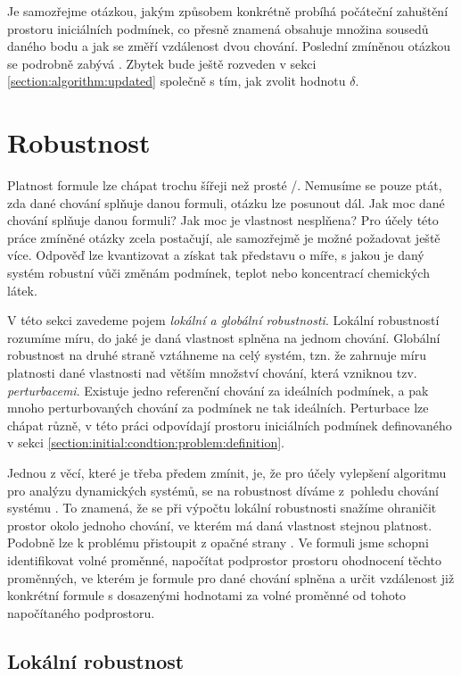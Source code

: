 Je samozřejme otázkou, jakým způsobem konkrétně probíhá počáteční zahuštění prostoru
iniciálních podmínek, co přesně znamená obsahuje mno\-žina sousedů daného bodu a jak
se změří vzdálenost dvou chování. Poslední zmíněnou otázkou se podrobně zabývá \cite{drazan2011}.
Zbytek bude ještě rozveden v sekci \ref{section:algorithm:updated} společně s tím,
jak zvolit hodnotu $\delta$.

\section{Robustnost}\label{section:robustness}

Platnost formule lze chápat trochu šířeji než prosté /.
Nemusíme se pouze ptát, zda dané chování splňuje danou formuli, otázku lze posunout dál.
Jak moc dané chování splňuje danou formuli? Jak moc je vlastnost nesplňena? Pro účely
této práce zmíněné otázky zcela postačují, ale samozřejmě je možné požadovat ještě více.
Odpověď lze kvantizovat a získat tak představu o míře, s  jakou je daný systém robustní
vůči změnám podmínek, teplot nebo koncentrací chemických látek.

V této sekci zavedeme pojem \textit{lokální a globální robustnosti}. Lokální robustností
rozumíme míru, do jaké je daná vlastnost splněna na jednom chování. Globální robustnost
na druhé straně vztáhneme na celý systém, tzn. že zahrnuje míru platnosti dané vlastnosti
nad větším množství chování, která vzniknou tzv. \textit{perturbacemi}. Existuje jedno
referenční chování za ideálních podmínek, a pak mnoho perturbovaných chování za podmínek
ne tak i\-deál\-ních. Perturbace lze chápat různě, v této práci odpovídají prostoru i\-ni\-ciál\-ních
podmínek definovaného v sekci \ref{section:initial:condtion:problem:definition}. 

Jednou z věcí, které je třeba předem zmínit, je, že pro účely vylepšení algoritmu pro
analýzu dynamických systémů, se na robustnost díváme z~pohledu chování systému \cite{donze2011}.
To znamená, že se při výpočtu lokální robustnosti snažíme ohraničit prostor okolo jednoho chování,
ve kterém má daná vlastnost stejnou platnost. Podobně lze k problému přistoupit z opačné strany \cite{rizk2009}.
Ve formuli jsme schopni identifikovat volné proměnné, na\-po\-čí\-tat podprostor prostoru ohodnocení těchto proměnných, ve kterém je formule
pro dané chování splněna a určit vzdálenost již konkrétní formule s dosazenými hodnotami za volné proměnné
od tohoto napočítaného podprostoru.

\subsection{Lokální robustnost}

